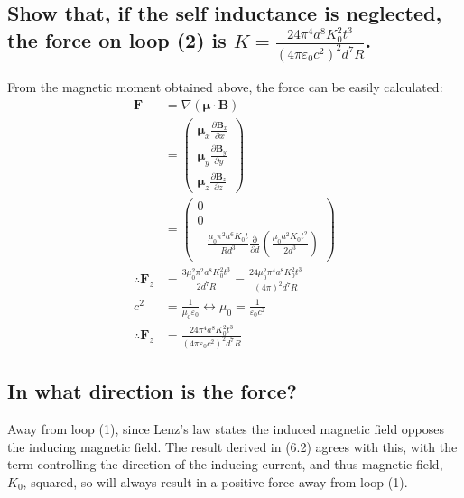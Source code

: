 \documentclass[a4paper]{scrartcl}
\begin{document}
\subsection{Show that, if the self inductance is neglected, the force on loop (2) is \(K = \frac{24 \pi^4 a^8 K_0^2 t^3}{(4 \pi \varepsilon_0 c^2)^2 d^7 R}\).}
From the magnetic moment obtained above, the force can be easily calculated:
\begin{align*}
    \mathbf{F} &= \nabla (\boldsymbol{\mu} \cdot \mathbf{B}) \\
    &= \begin{pmatrix}
        \boldsymbol{\mu}_x \frac{\partial \mathbf{B}_x}{\partial x} \\
        \boldsymbol{\mu}_y \frac{\partial \mathbf{B}_y}{\partial y} \\
        \boldsymbol{\mu}_z \frac{\partial \mathbf{B}_z}{\partial z}
    \end{pmatrix} \\
    &= \begin{pmatrix}
        0 \\
        0 \\
        -\frac{\mu_0 \pi^2 a^6 K_0 t}{R d^3} \frac{\mathrm{\partial}}{\partial d} \left( \frac{\mu_0 a^2 K_0 t^2}{2 d^3} \right)
    \end{pmatrix} \\
    \therefore \mathbf{F}_z &= \frac{3 \mu_0^2 \pi^2 a^8 K_0^2 t^3}{2 d^7 R} = \frac{24 \mu_0^2 \pi^4 a^8 K_0^2 t^3}{(4 \pi)^2 d^7 R} \\
    c^2 &= \frac{1}{\mu_0 \varepsilon_0} \leftrightarrow \mu_0 = \frac{1}{\varepsilon_0 c^2} \\
    \therefore \mathbf{F}_z &= \frac{24 \pi^4 a^8 K_0^2 t^3}{(4 \pi \varepsilon_0 c^2)^2 d^7 R}
\end{align*}

\subsection{In what direction is the force?}
Away from loop (1), since Lenz's law states the induced magnetic field opposes the inducing magnetic field. The result derived in (6.2) agrees with this, with the term controlling the direction of the inducing current, and thus magnetic field, \(K_0\), squared, so will always result in a positive force away from loop (1).
\end{document}
